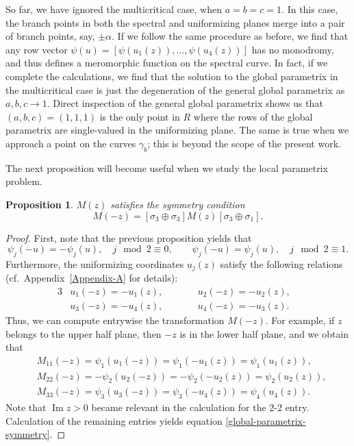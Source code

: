 \documentclass[10pt,a4paper]{amsart}
\numberwithin{equation}{section}
\newtheorem{Proposition}[Theorem]{Proposition}
 { \theoremstyle{definition}
\newtheorem{Definition}[Theorem]{Definition}
\newtheorem{Note}[Theorem]{Note}
\newtheorem{Example}[Theorem]{Example}
\newtheorem{Remark}[Theorem]{Remark} }
\begin{document}
\begin{Remark}
 So far, we have ignored the multicritical case, when $a=b=c=1$. In this case, the branch points in both the spectral and uniformizing planes merge into a pair of branch points, say, $\pm \alpha$. If we follow the same procedure as before, we find that any row vector ${\psi(u) = [\psi(u_1(z)), \dots, \psi(u_4(z))]}$ has no monodromy, and thus defines a meromorphic function on the spectral curve. In fact, if we complete the calculations, we find that the solution to the global parametrix in the multicritical case is just the degeneration of the general global parametrix as~${a,b,c\to 1}$. Direct inspection of the general global parametrix shows us that~${(a,b,c) = (1,1,1)}$ is the only point in $R$ where the rows of the global parametrix are single-valued in the uniformizing plane. The same is true when we approach a point on the curves $\gamma_b$; this is beyond the scope of the present work.
\end{Remark}
The next proposition will become useful when we study the local parametrix problem.
\begin{Proposition}\label{global-parametrix-prop}
 $M(z)$ satisfies the symmetry condition
 \begin{equation} \label{global-parametrix-symmetry}
 M(-z) = \left[\sigma_3 \oplus \sigma_3 \right] M(z) [\sigma_3 \oplus \sigma_1].
 \end{equation}
\end{Proposition}
\begin{proof}
 First, note that the previous proposition yields that
 \begin{equation*}
 \psi_j(-u) = -\psi_j(u), \quad j \mod 2 \equiv 0, \qquad \psi_j(-u) = \psi_j(u), \quad j \mod 2 \equiv 1.
 \end{equation*}
 Furthermore, the uniformizing coordinates $u_j(z)$ satisfy the following relations (cf.\ Appendix~\ref{Appendix-A} for details):
 \begin{alignat*}{3}
 &u_1(-z) = -u_1(z), \qquad&& u_2(-z) = -u_2(z),&\\
 &u_3(-z) = -u_4(z), \qquad&& u_4(-z) = -u_3(z).&
 \end{alignat*}
 Thus, we can compute entrywise the transformation $M(-z)$. For example, if $z$ belongs to the upper half plane, then $-z$ is in the lower half plane, and we obtain that
 \begin{align*}
 &M_{11}(-z)= \psi_1(u_1(-z)) = \psi_1(-u_1(z)) = \psi_1(u_1(z)),\\
 &M_{22}(-z)= -\psi_2(u_2(-z)) = -\psi_2(-u_2(z)) = \psi_2(u_2(z)),\\
 &M_{33}(-z)= \psi_3(u_3(-z)) = \psi_3(-u_4(z)) = \psi_4(u_4(z)).
 \end{align*}
 Note that $\operatorname{Im} z > 0$ became relevant in the calculation for the 2-2 entry.
 Calculation of the remaining entries yields equation \eqref{global-parametrix-symmetry}.
\end{proof}
\end{document}
